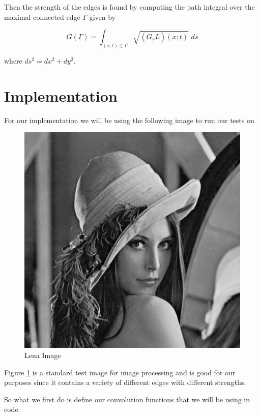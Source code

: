 \documentclass{article}
\begin{document}
    Then the strength of the edges is found by computing the path integral over the maximal connected edge $\Gamma$ given by

    \begin{equation}
        G(\Gamma) = \int_{(x;t) \in \Gamma} \sqrt{(G_{\gamma}L)(x;t)} \,\, ds
    \end{equation}

    where $ds^2=dx^2+dy^2$.

\section{Implementation}
    For our implementation we will be using the following image to run our tests on

    \begin{figure}[H]
    \centering
        \includegraphics[scale=0.5]{Images/lena.jpg}
        \caption{Lena Image}
        \label{lena_o}
    \end{figure}

    Figure \ref{lena_o} is a standard test image for image processing and is good for our purposes since it contains a variety of different edges with different strengths. 

    So what we first do is define our convolution functions that we will be using in code.
\end{document}

